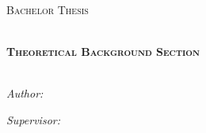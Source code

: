 \documentclass[
11pt, %
oneside, %
ukrainian,
english, %
singlespacing, %
headsepline, %
]{BachelorMasterThesis} %
\author{Maksym \textsc{Mykhasyuta}} %
\begin{document}
\frontmatter %

\pagestyle{plain} %


\begin{titlepage}
\begin{center}

\vspace*{.06\textheight}
{\scshape\LARGE \univname\par}\vspace{1.5cm} %
\textsc{\Large Bachelor Thesis}\\[0.5cm] %

\HRule \\[0.4cm] %
{\huge \bfseries \ttitle\par}\vspace{0.4cm} %

\textsc{\Large \bfseries Theoretical Background Section}\\[0.5cm] %
\HRule \\[1.5cm] %

\begin{minipage}[t]{0.4\textwidth}
\begin{flushleft} \large
\emph{Author:}\\
\href{https://www.linkedin.com/in/maksym-mykhasyuta-b78792220/}{\authorname} %
\end{flushleft}
\end{minipage}
\begin{minipage}[t]{0.4\textwidth}
\begin{flushright} \large
\emph{Supervisor:} \\
\href{https://www.linkedin.com/in/jetlab/}{\supname} %
\end{flushright}
\end{minipage}\\[3cm]
 
\vfill

 

\end{center}
\end{titlepage}
\end{document}
